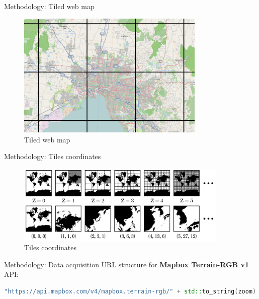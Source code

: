 \documentclass[10pt]{beamer}
\begin{document}
\begin{frame}{Methodology: Tiled web map}
  \begin{figure}[H]
    \centering
    \includegraphics[width=0.8\textwidth]{images/tiled-web-map.png}
    \caption{Tiled web map \cite{img:tiled-web-map}}
  \end{figure}
\end{frame}

\begin{frame}{Methodology: Tiles coordinates}
  \begin{figure}[H]
    \centering
    \includegraphics[width=0.9\textwidth]{images/tiles-coordinates.png}
    \caption{Tiles coordinates \cite{img:tiles-coordinates}}
  \end{figure}
\end{frame}

\begin{frame}[fragile]{Methodology: Data acquisition}
  \Large
  URL structure for \textbf{Mapbox Terrain-RGB v1} API:
  \vspace{2em}
  \begin{lstlisting}[language=C++]
"https://api.mapbox.com/v4/mapbox.terrain-rgb/" + std::to_string(zoom) + "/" + std::to_string(x) + "/" + std::to_string(y) + ".png?access_token=" + api_key;
  \end{lstlisting}
\end{frame}
\end{document}
